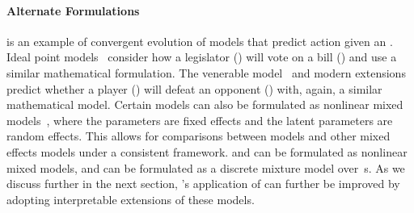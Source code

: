 \paragraph{\textbf{Alternate Formulations}}
%
\irt{} is an example of convergent evolution of models that
predict \subj{} action given an \itm{}.
%
Ideal point models~\cite{poole2017voting} consider how a legislator (\subj{})
will vote on a bill (\itm{}) and use a similar mathematical formulation.
%
The venerable  model~\cite{glickman-99} and modern
extensions~\cite{herbrich-07} predict whether a player (\subj{}) will
defeat an opponent (\itm{}) with, again, a similar mathematical model.
%
Certain \irt{} models can also be formulated as nonlinear mixed
models~\cite{rijmen2003nonlinear}, where the \itm{} parameters are fixed effects
and the latent \subj{} parameters are random effects.
%
This allows for comparisons between \irt{} models and other mixed effects models
under a consistent framework.
    {\bf {}} and {\bf {}} can be formulated as nonlinear mixed models, and {\bf {}} can be formulated as a discrete mixture model over~\itm{}s.
%
As we discuss further in the next section, \name{}'s application of
\irt{} can further be improved by adopting interpretable extensions of
these models.


